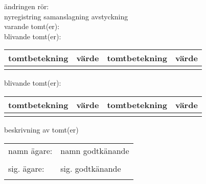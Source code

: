 \documentclass{letter}
\begin{document}
ändringen rör:\\
\Square nyregistring
\Square samanslagning
\Square	avstyckning
\\
varande tomt(er):\\
blivande tomt(er):\\
\begin{tabular}{ |p{3.5cm}|p{2.5cm}| p{3.5cm}|p{2.5cm}|}
	tomtbetekning & värde  & tomtbetekning & värde\\ \hline
	\vspace{1.5cm}& \vspace{1.5cm} &\vspace{1.5cm}& \vspace{1.5cm}\\
\end{tabular}
blivande tomt(er):\\
\begin{tabular}{ |p{3.5cm}|p{2.5cm}| p{3.5cm}|p{2.5cm}|}
	tomtbetekning & värde  & tomtbetekning & värde\\ \hline
	\vspace{3cm}& \vspace{3cm} &\vspace{3cm}& \vspace{3cm}\\
\end{tabular}

beskrivning av tomt(er)
\vfill
\begin{tabular}{p{6cm} p{6cm}}
namn ägare:& namn godtkänande \\
\vspace{1.5cm}& \vspace{1.5cm} \\
sig. ägare:& sig. godtkänande \\
\vspace{1.5cm}& \vspace{1.5cm} \\

\end{tabular}
\end{document}
